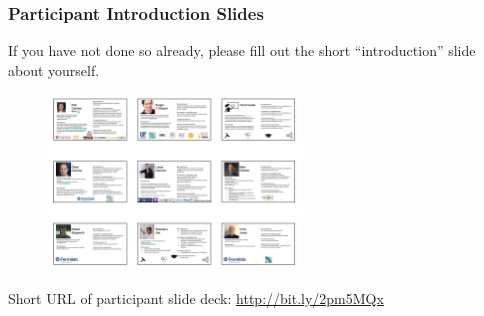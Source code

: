 \begin{frame}
\frametitle{Participant Introduction Slides}

If you have not done so already, please fill out the short ``introduction''
slide about yourself. 
\begin{figure}[htbp]
\begin{center}
\includegraphics[width=0.6\textwidth]{images/s2i2-hep-cs-intros-page.png}
\end{center}
\end{figure}
Short URL of participant slide deck: \url{http://bit.ly/2pm5MQx}

\end{frame}


